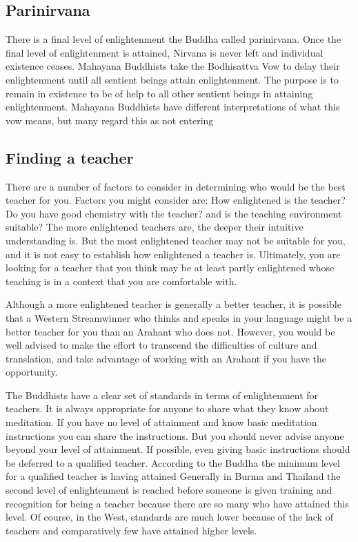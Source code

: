 \documentclass[a5paper,10pt,english]{book}
\begin{document}
\subsection{Parinirvana}
\label{\detokenize{saints:parinirvana}}
\sphinxAtStartPar
There is a final level of enlightenment the Buddha called parinirvana.
Once the final level of enlightenment is attained, Nirvana is never left
and individual existence ceases. Mahayana Buddhists take the Bodhisattva
Vow to delay their enlightenment until all sentient beings attain
enlightenment. The purpose is to remain in existence to be of help to
all other sentient beings in attaining enlightenment. Mahayana Buddhists
have different interpretations of what this vow means, but many regard
this as not entering 


\subsection{Finding a teacher}
\label{\detokenize{saints:finding-a-teacher}}
\sphinxAtStartPar
There are a number of factors to consider in determining who would be
the best teacher for you. Factors you might consider are: How
enlightened is the teacher? Do you have good chemistry with the teacher?
and is the teaching environment suitable? The more enlightened teachers
are, the deeper their intuitive understanding is. But the most
enlightened teacher may not be suitable for you, and it is not easy to
establish how enlightened a teacher is. Ultimately, you are looking for
a teacher that you think may be at least partly enlightened whose
teaching is in a context that you are comfortable with.

\sphinxAtStartPar
Although a more enlightened teacher is generally a better teacher, it is
possible that a Western Stream\sphinxhyphen{}winner who thinks and speaks in your
language might be a better teacher for you than an Arahant who does not.
However, you would be well advised to make the effort to transcend the
difficulties of culture and translation, and take advantage of working
with an Arahant if you have the opportunity.

\sphinxAtStartPar
The Buddhists have a clear set of standards in terms of enlightenment
for teachers. It is always appropriate for anyone to share what they
know about meditation. If you have no level of attainment and know basic
meditation instructions you can share the instructions. But you should
never advise anyone beyond your level of attainment. If possible, even
giving basic instructions should be deferred to a qualified teacher.
According to the Buddha the minimum level for a qualified teacher is
having attained  Generally in Burma and Thailand the
second level of enlightenment is reached before someone is given
training and recognition for being a teacher because there are so many
who have attained this level. Of course, in the West, standards are much
lower because of the lack of teachers and comparatively few have
attained higher levels.
\end{document}
